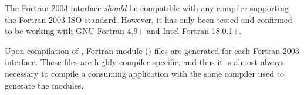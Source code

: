 The {\sundials} Fortran 2003 interface \textit{should} be compatible with any compiler
supporting the Fortran 2003 ISO standard. However, it has only been tested and confirmed
to be working with GNU Fortran 4.9+ and Intel Fortran 18.0.1+.

Upon compilation of {\sundials}, Fortran module () files are generated
for each Fortran 2003 interface. These files are highly compiler specific, and
thus it is almost always necessary to compile a consuming application with the
same compiler used to generate the modules.
